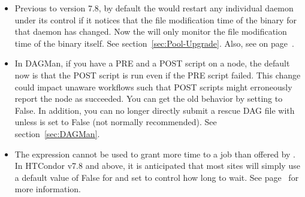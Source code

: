 \begin{itemize}
\item Previous to version 7.8, by default the  would restart any
	individual daemon under its control if it notices that the file
	modification time of the binary for that daemon has changed.  Now the
	 will only monitor the file modification time of the
	 binary itself.  See section~\ref{sec:Pool-Upgrade}.  Also,
	see  on
	page~\pageref{param:MasterNewBinaryRestart}.

\item In DAGMan, if you have a PRE and a POST script on a node, the default now
	is that the POST script is run even if the PRE script failed.   This change
	could impact unaware workflows such that POST scripts might erroneously
	report the node as succeeded. You can get the old behavior by setting
	 to False.  In addition, you can no
	longer directly submit a rescue DAG file with  unless
	 is set to False (not normally
	recommended).  See section~\ref{sec:DAGMan}.

\item The  expression cannot be used to grant more time to a job
	than offered by . In HTCondor v7.8 and above, it
	is anticipated that most sites will simply use a default value of False for
	 and set  to control how long
	to wait.  See page~\pageref{param:MachineMaxVacateTime} for more
	information.


\end{itemize}

